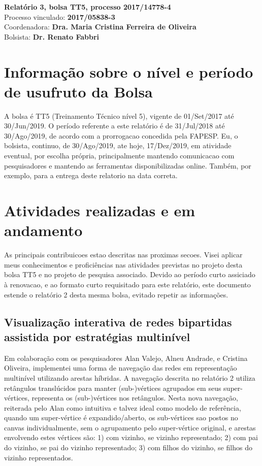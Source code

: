 \documentclass[a4paper, 11pt]{article}
\begin{document}
\noindent
\normalsize
 \textbf{Relatório 3, bolsa TT5, processo 2017/14778-4}\\
Processo vinculado: \textbf{2017/05838-3} \\
Coordenadora: \textbf{Dra. Maria Cristina Ferreira de Oliveira} \\
Bolsista: \textbf{Dr. Renato Fabbri}

\section{Informação sobre o nível e período de usufruto da Bolsa}
A bolsa é TT5 (Treinamento Técnico nível 5), vigente de 01/Set/2017 até 30/Jun/2019.
O período referente a este relatório é de 31/Jul/2018 até 30/Ago/2019,
de acordo com a prorrogacao concedida pela FAPESP.
Eu, o bolsista, continuo, de 30/Ago/2019, ate hoje, 17/Dez/2019, em atividade eventual, 
por escolha própria, principalmente mantendo comunicacao com pesquisadores e
mantendo as ferramentas disponibilizadas online.
Também, por exemplo, para a entrega deste relatorio na data correta.

\section{Atividades realizadas e em andamento}\label{desc}
As principais contribuicoes estao descritas nas proximas secoes.
Visei aplicar meus conhecimentos e proficiências nas atividades previstas no projeto desta bolsa TT5
e no projeto de pesquisa associado.
Devido ao período curto assiciado à renovacao, e ao formato curto requisitado
para este relatório, este documento estende o relatório 2
desta mesma bolsa, evitado repetir as informações.

\subsection{Visualização interativa de redes bipartidas assistida por estratégias multinível}\label{sml}
Em colaboração com os pesquisadores Alan Valejo, Alneu Andrade, e Cristina Oliveira,
implementei uma forma de navegação das redes em representação multinível
utilizando arestas híbridas. A navegação descrita no relatório 2 utiliza retângulos translúcidos
para manter (sub-)vértices agrupados em seus super-vértices, representa os (sub-)vértices nos retângulos.
Nesta nova navegação, reiterada pelo Alan como intuitiva e talvez ideal como modelo de referência,
quando um super-vértice é expandido/aberto, os sub-vértices sao postos no canvas individualmente, sem
o agrupamento pelo super-vértice original, e arestas envolvendo estes vértices são:
1) com vizinho, se vizinho representado;
2) com pai do vizinho, se pai do vizinho representado;
3) com filhos do vizinho, se filhos do vizinho representados.
\end{document}
